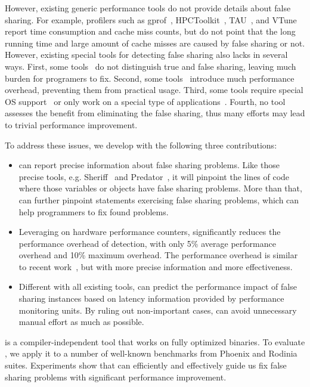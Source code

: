 However, existing generic performance tools do not provide details about false sharing. For example, profilers such as gprof~\cite{gprof}, HPCToolkit~\cite{}, TAU~\cite{}, and VTune~\cite{} report time consumption and cache miss counts, but do not point that the long running time and large amount of cache misses are caused by false sharing or not. However, existing special tools for detecting false sharing also lacks in several ways. First, some tools~\cite{falseshare:binaryinstrumentation1,detect:ptu,detect:intel,falseshare:binaryinstrumentation2,DProf, qinzhao, OSdetection, mldetect, Wicaksono11detectingfalse, openmp} do not distinguish true and false sharing, leaving much burden for programers to fix. Second, some tools~\cite{falseshare:binaryinstrumentation1,falseshare:binaryinstrumentation2,falseshare:simulator, Predator} introduce much performance overhead, preventing them from practical usage. Third, some tools require special OS support~\cite{OSdetection} or only work on a special type of applications~\cite{sheriff}. Fourth, no tool assesses the benefit from eliminating the false sharing, thus many efforts may lead to trivial performance improvement.


To address these issues, we develop \cheetah{} with the following three contributions:

\begin{itemize} 
\item \cheetah{} can report precise information about false sharing problems. Like those precise tools, e.g. Sheriff~\cite{sheriff} and Predator~\cite{Predator}, it will pinpoint the lines of code where those variables or objects have false sharing problems. More than that, \cheetah{} can further pinpoint statements exercising false sharing problems, which can help programmers to fix found problems. 

\item Leveraging on hardware performance counters, \cheetah{} significantly reduces the performance overhead of detection, with only 5\% average performance overhead and 10\% maximum overhead. The performance overhead is similar to recent work~\cite{mldetect, openmp}, but with more precise information and more effectiveness.
  
\item Different with all existing tools, \Cheetah{} can predict the performance impact of false sharing instances based on latency information provided by performance monitoring units. By ruling out non-important cases, \Cheetah{} can avoid unnecessary manual effort as much as possible. 
\end{itemize}
\cheetah{} is a compiler-independent tool that works on fully optimized binaries. To evaluate \cheetah{}, we apply it to a number of well-known benchmarks from Phoenix and Rodinia suites. Experiments show that \cheetah{} can efficiently and effectively guide us fix false sharing problems with significant performance improvement.

